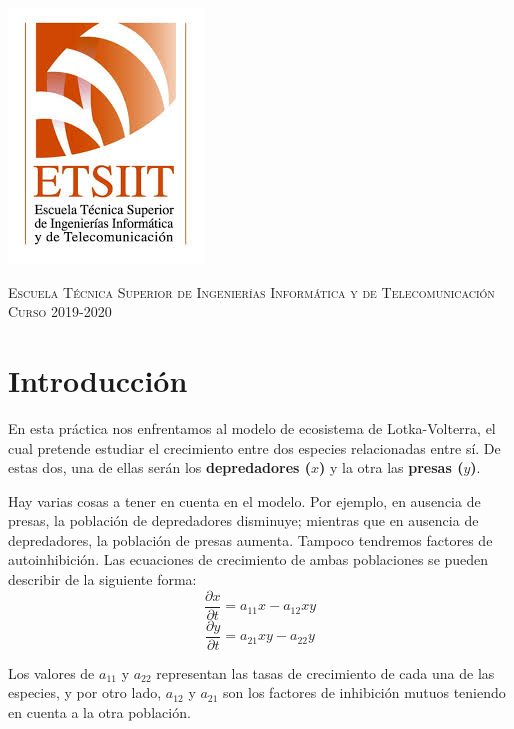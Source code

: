 \documentclass[11pt,a4paper]{article}
\begin{document}
\begin{titlepage}
\begin{minipage}{\textwidth}
\includegraphics[scale=0.3]{img/etsiit.jpeg}

\vspace{0.7cm}
\textsc{Escuela Técnica Superior de Ingenierías Informática y de Telecomunicación}\\
\vspace{1cm}
\textsc{Curso 2019-2020}
\end{minipage}
\end{titlepage}

\tableofcontents
\thispagestyle{empty}				%

\newpage

\setlength{\parskip}{1em}

\section{Introducción}

En esta práctica nos enfrentamos al modelo de ecosistema de Lotka-Volterra, el cual pretende estudiar el crecimiento entre dos especies
relacionadas entre sí. De estas dos, una de ellas serán los \textbf{depredadores ($x$)} y la otra las \textbf{presas ($y$)}.

Hay varias cosas a tener en cuenta en el modelo. Por ejemplo, en ausencia de presas, la población de depredadores disminuye; mientras que
en ausencia de depredadores, la población de presas aumenta. Tampoco tendremos factores de autoinhibición. Las ecuaciones de crecimiento
de ambas poblaciones se pueden describir de la siguiente forma:
$$\frac{\partial x}{\partial t} = a_{11}x-a_{12}xy$$
$$\frac{\partial y}{\partial t} = a_{21}xy-a_{22}y$$

Los valores de $a_{11}$ y $a_{22}$ representan las tasas de crecimiento de cada una de las especies, y por otro lado, $a_12$ y $a_21$ son los
factores de inhibición mutuos teniendo en cuenta a la otra población.
\end{document}
